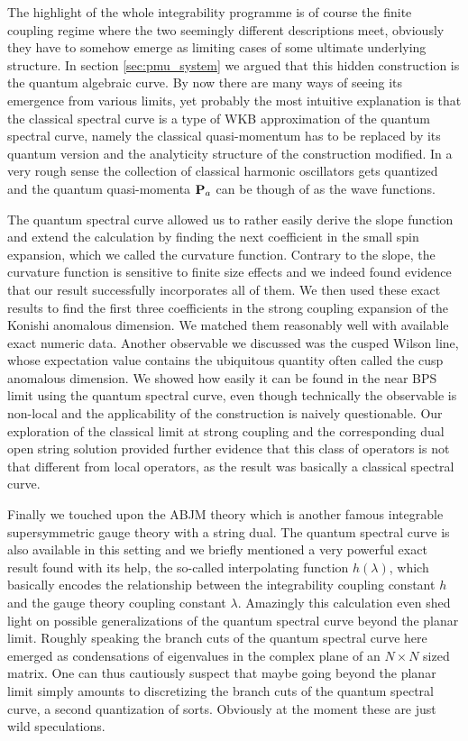 The highlight of the whole integrability programme is of course the finite coupling regime where the two seemingly different descriptions meet, obviously they have to somehow emerge as limiting cases of some ultimate underlying structure.
In section \ref{sec:pmu_system} we argued that this hidden construction is the quantum algebraic curve. 
By now there are many ways of seeing its emergence from various limits, yet probably the most intuitive explanation is that the classical spectral curve is a type of WKB approximation of the quantum spectral curve, namely the classical quasi-momentum has to be replaced by its quantum version and the analyticity structure of the construction modified.
In a very rough sense the collection of classical harmonic oscillators gets quantized and the quantum quasi-momenta ${\bf P}_a$ can be though of as the wave functions. 

The quantum spectral curve allowed us to rather easily derive the slope function and extend the calculation by finding the next coefficient in the small spin expansion, which we called the curvature function.
Contrary to the slope, the curvature function is sensitive to finite size effects and we indeed found evidence that our result successfully incorporates all of them.
We then used these exact results to find the first three coefficients in the strong coupling expansion of the Konishi anomalous dimension.
We matched them reasonably well with available exact numeric data.
Another observable we discussed was the cusped Wilson line, whose expectation value contains the ubiquitous quantity often called the cusp anomalous dimension.
We showed how easily it can be found in the near BPS limit using the quantum spectral curve, even though technically the observable is non-local and the applicability of the construction is naively questionable.
Our exploration of the classical limit at strong coupling and the corresponding dual open string solution provided further evidence that this class of operators is not that different from local operators, as the result was basically a classical spectral curve.

Finally we touched upon the ABJM theory which is another famous integrable supersymmetric gauge theory with a string dual.
The quantum spectral curve is also available in this setting and we briefly mentioned a very powerful exact result found with its help, the so-called interpolating function $h(\lambda)$, which basically encodes the relationship between the integrability coupling constant $h$ and the gauge theory coupling constant $\lambda$.
Amazingly this calculation even shed light on possible generalizations of the quantum spectral curve beyond the planar limit.
Roughly speaking the branch cuts of the quantum spectral curve here emerged as condensations of eigenvalues in the complex plane of an $N \times N$ sized matrix.
One can thus cautiously suspect that maybe going beyond the planar limit simply amounts to discretizing the branch cuts of the quantum spectral curve, a second quantization of sorts. 
Obviously at the moment these are just wild speculations.

